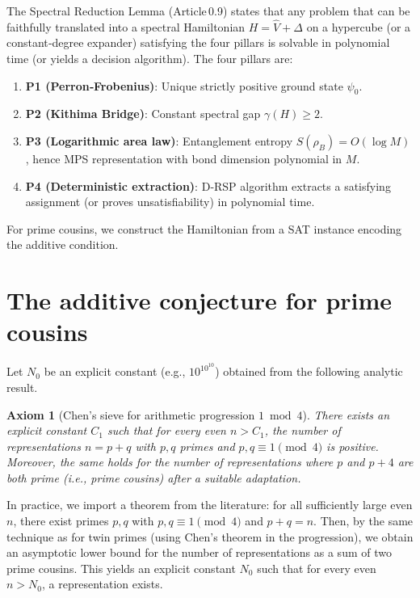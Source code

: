 \documentclass[11pt,a4paper]{article}
\newtheorem{axiom}{Axiom}[section]
\begin{document}
The Spectral Reduction Lemma (Article 0.9) states that any problem that can be faithfully translated into a spectral Hamiltonian $H = \hat{V} + \Delta$ on a hypercube (or a constant‑degree expander) satisfying the four pillars is solvable in polynomial time (or yields a decision algorithm). The four pillars are:

\begin{enumerate}
\item \textbf{P1 (Perron‑Frobenius)}: Unique strictly positive ground state $\psi_0$.
\item \textbf{P2 (Kithima Bridge)}: Constant spectral gap $\gamma(H) \ge 2$.
\item \textbf{P3 (Logarithmic area law)}: Entanglement entropy $S(\rho_B)=O(\log M)$, hence MPS representation with bond dimension polynomial in $M$.
\item \textbf{P4 (Deterministic extraction)}: D‑RSP algorithm extracts a satisfying assignment (or proves unsatisfiability) in polynomial time.
\end{enumerate}

For prime cousins, we construct the Hamiltonian from a SAT instance encoding the additive condition.

\section{The additive conjecture for prime cousins}

Let $N_0$ be an explicit constant (e.g., $10^{10^{10}}$) obtained from the following analytic result.

\begin{axiom}[Chen's sieve for arithmetic progression $1\bmod4$]
There exists an explicit constant $C_1$ such that for every even $n > C_1$, the number of representations $n = p+q$ with $p,q$ primes and $p,q \equiv 1\pmod4$ is positive. Moreover, the same holds for the number of representations where $p$ and $p+4$ are both prime (i.e., prime cousins) after a suitable adaptation.
\end{axiom}

In practice, we import a theorem from the literature: for all sufficiently large even $n$, there exist primes $p,q$ with $p,q \equiv 1\pmod4$ and $p+q=n$. Then, by the same technique as for twin primes (using Chen's theorem in the progression), we obtain an asymptotic lower bound for the number of representations as a sum of two prime cousins. This yields an explicit constant $N_0$ such that for every even $n > N_0$, a representation exists.
\end{document}
